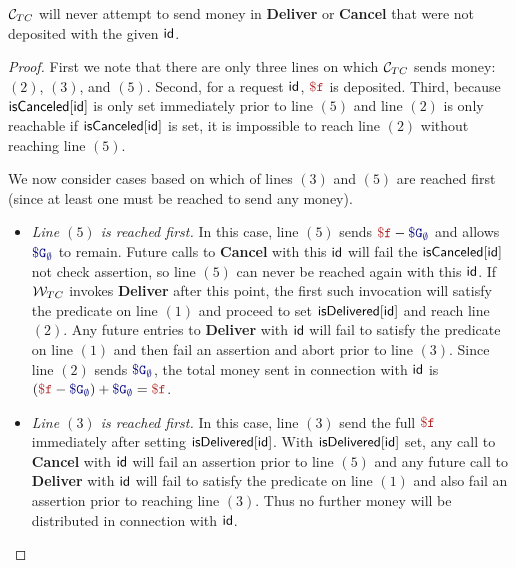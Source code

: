\begin{lemma}
\label{lem:no-money-theft}
$\tcont$ will never attempt to send money in {\bf Deliver} or {\bf Cancel} that were not deposited with the given ${\sf id}$.
\end{lemma}

\begin{proof}
First we note that there are only three lines on which $\tcont$ sends money: $(2)$, $(3)$, and $(5)$.
Second, for a request ${\sf id}$, $\fee$ is deposited.
Third, because ${\sf isCanceled}[{\sf id}]$ is only set immediately prior to line $(5)$ and line $(2)$
is only reachable if ${\sf isCanceled}[{\sf id}]$ is set, it is impossible to reach line $(2)$ without reaching line $(5)$.

We now consider cases based on which of lines $(3)$ and $(5)$ are reached first (since at least one must be reached to send any money).
\begin{itemize}

\item {\it Line $(5)$ is reached first.}
In this case, line $(5)$ sends $\fee - \constgascancel$ and allows $\constgascancel$ to remain.
Future calls to {\bf Cancel} with this ${\sf id}$ will fail the ${\sf isCanceled}[{\sf id}]$ not check assertion, so line $(5)$ can never be reached again with this ${\sf id}$.
If $\tcadd$ invokes {\bf Deliver} after this point, the first such invocation will satisfy the predicate on line $(1)$ and proceed to set ${\sf isDelivered}[{\sf id}]$ and reach line $(2)$.
Any future entries to {\bf Deliver} with ${\sf id}$ will fail to satisfy the predicate on line $(1)$ and then fail an assertion and abort prior to line $(3)$.
Since line $(2)$ sends $\constgascancel$, the total money sent in connection with ${\sf id}$ is $(\fee - \constgascancel) + \constgascancel = \fee$.


\item {\it Line $(3)$ is reached first.}
In this case, line $(3)$ send the full $\fee$ immediately after setting ${\sf isDelivered}[{\sf id}]$.
With ${\sf isDelivered}[{\sf id}]$ set, any call to {\bf Cancel} with ${\sf id}$ will fail an assertion prior to line $(5)$
and any future call to {\bf Deliver} with ${\sf id}$ will fail to satisfy the predicate on line $(1)$ and also fail an assertion prior to reaching line $(3)$.
Thus no further money will be distributed in connection with ${\sf id}$.
\end{itemize}
\end{proof}





